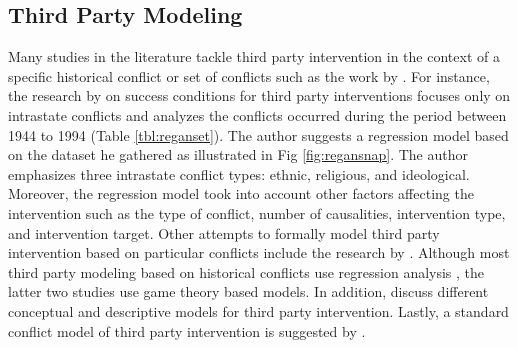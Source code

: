 \documentclass[letterpaper,12pt,titlepage,oneside,final]{book}
\begin{document}
\subsection{Third Party Modeling}
\label{sec:tpmodel}
Many studies in the literature tackle third party intervention in the context of a specific historical conflict or set of conflicts such as the work by \citet{regan1996,bercovitch1991,dixon1996}.  For instance, the research by \citet{regan1996} on success conditions for third party interventions focuses only on intrastate conflicts and analyzes the conflicts occurred during the period between 1944 to 1994 (Table \ref{tbl:reganset}). The author suggests a regression model based on the dataset he gathered as illustrated in Fig \ref{fig:regansnap}.  The author emphasizes three intrastate conflict types: ethnic, religious, and ideological. Moreover, the regression model took into account other factors affecting the intervention such as the type of conflict, number of causalities, intervention type, and intervention target.
Other attempts to formally model third party intervention based on particular conflicts include the research by \citet{carment1996,HipelRami}. Although most third party modeling based on historical conflicts use regression analysis \citep{regan1996,dixon1996}, the latter two studies use game theory based models. In addition, \citet{fisher2001,lewicki1992} discuss different conceptual and descriptive models for third party intervention. Lastly, a standard conflict model of third party intervention is suggested by \citet{siqueira2003}.
\end{document}
